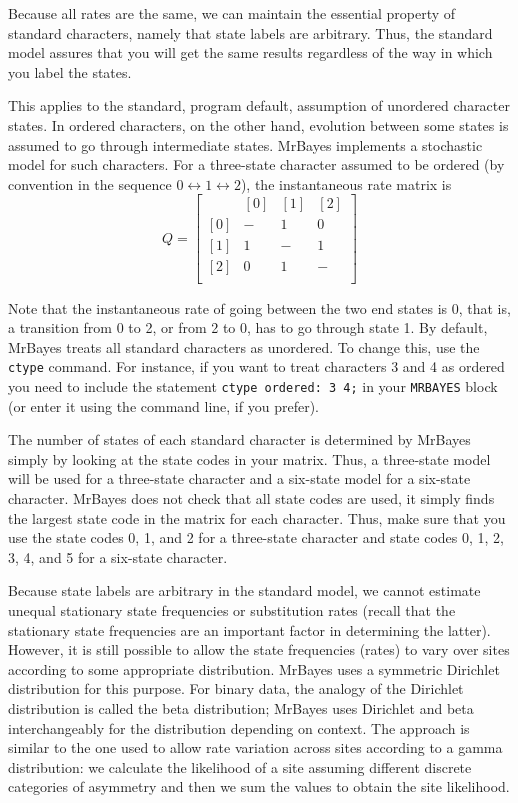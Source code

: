 \documentclass[12pt]{book}
\begin{document}
Because all rates are the same, we can maintain the essential property of standard characters,
namely that state labels are arbitrary. Thus, the standard model assures that you will get the same
results regardless of the way in which you label the states.

This applies to the standard, program default, assumption of unordered character states. In ordered
characters, on the other hand, evolution between some states is assumed to go through intermediate
states. MrBayes implements a stochastic model for such characters. For a three-state character
assumed to be ordered (by convention in the sequence $0 \leftrightarrow 1 \leftrightarrow 2$), the
instantaneous rate matrix is
\[
Q=\begin{bmatrix}
    & [0] & [1] & [2]\\
 [0]& - & 1 & 0\\
 [1]& 1& -  & 1\\
 [2]& 0& 1  & -\\
\end{bmatrix}
\]

Note that the instantaneous rate of going between the two end states is 0, that is, a transition
from 0 to 2, or from 2 to 0, has to go through state 1. By default, MrBayes treats all standard
characters as unordered. To change this, use the \texttt{ctype} command. For instance, if you want
to treat characters 3 and 4 as ordered you need to include the statement \texttt{ctype ordered: 3
4;} in your \texttt{MRBAYES} block (or enter it using the command line, if you prefer).

The number of states of each standard character is determined by MrBayes simply by looking at the
state codes in your matrix. Thus, a three-state model will be used for a three-state character and
a six-state model for a six-state character. MrBayes does not check that all state codes are used,
it simply finds the largest state code in the matrix for each character. Thus, make sure that you
use the state codes 0, 1, and 2 for a three-state character and state codes 0, 1, 2, 3, 4, and 5
for a six-state character.

Because state labels are arbitrary in the standard model, we cannot estimate unequal stationary
state frequencies or substitution rates (recall that the stationary state frequencies are an
important factor in determining the latter). However, it is still possible to allow the state
frequencies (rates) to vary over sites according to some appropriate distribution. MrBayes uses a
symmetric Dirichlet distribution for this purpose. For binary data, the analogy of the Dirichlet
distribution is called the beta distribution; MrBayes uses Dirichlet and beta interchangeably for
the distribution depending on context. The approach is similar to the one used to allow rate
variation across sites according to a gamma distribution: we calculate the likelihood of a site
assuming different discrete categories of asymmetry and then we sum the values to obtain the site
likelihood.
\end{document}
